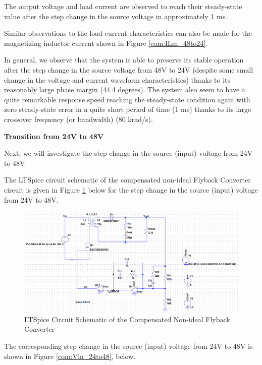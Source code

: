 The output voltage and load current are observed to reach their steady-state value after the step change in the source voltage in approximately 1 ms.

Similar observations to the load current characteristics can also be made for the magnetizing inductor current shown in Figure \ref{com:ILm_48to24}.

In general, we observe that the system is able to preserve its stable operation after the step change in the source voltage from 48V to 24V (despite some small change in the voltage and current waveform characteristics) thanks to its reasonably large phase margin (44.4 degrees). The system also seem to have a quite remarkable response speed reaching the steady-state condition again with zero steady-state error in a quite short period of time (1 ms) thanks to its large crossover frequency (or bandwidth) (80 krad/s).

\textbf{Transition from 24V to 48V}

Next, we will investigate the step change in the source (input) voltage from 24V to 48V.

The LTSpice circuit schematic of the compensated non-ideal Flyback Converter circuit is given in Figure \ref{com:schematic_24to48} below for the step change in the source (input) voltage from 24V to 48V.

\begin{figure}[H]
\begin{center}
\includegraphics[width=1\textwidth]{comp_simulations/schematic_24to48.png}
\caption{LTSpice Circuit Schematic of the Compensated Non-ideal Flyback Converter}
\label{com:schematic_24to48}
\end{center}
\end{figure}

The corresponding step change in the source (input) voltage from 24V to 48V is shown in Figure \ref{com:Vin_24to48}, below.

